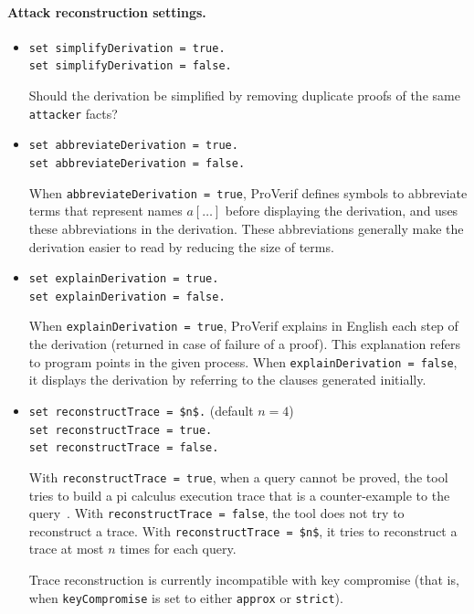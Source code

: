 \documentclass{book}
\begin{document}
\paragraph{Attack reconstruction settings.}
\begin{itemize}
\item \lstinline{set simplifyDerivation = true.}\\
\lstinline{set simplifyDerivation = false.}

Should the derivation be simplified by removing duplicate proofs
of the same \lstinline{attacker} facts?

\item \lstinline{set abbreviateDerivation = true.}\\
\lstinline{set abbreviateDerivation = false.}

When \lstinline{abbreviateDerivation = true}, ProVerif defines symbols to
abbreviate terms that represent names $a[\ldots]$ before displaying
the derivation, and uses these abbreviations in the derivation. These
abbreviations generally make the derivation easier to read by reducing
the size of terms.

\item \lstinline{set explainDerivation = true.}\\
\lstinline{set explainDerivation = false.}

When \lstinline{explainDerivation = true}, ProVerif explains in English
each step of the derivation (returned in case of failure of a proof).
This explanation refers to program points in the given process.
When \lstinline{explainDerivation = false}, it displays the derivation
by referring to the clauses generated initially.

\item \lstinline{set reconstructTrace = $n$.} (default $n = 4$)\\
\lstinline{set reconstructTrace = true.}\\
\lstinline{set reconstructTrace = false.}

With \lstinline{reconstructTrace = true}, when a query cannot be
proved, the tool tries to build a pi calculus execution trace that is
a counter-example to the query~\cite{Allamigeon05}.
With \lstinline{reconstructTrace = false}, the tool does not try
to reconstruct a trace. With \lstinline{reconstructTrace = $n$},
it tries to reconstruct a trace at most $n$ times for each query.

Trace reconstruction is currently incompatible
with key compromise (that is, when \lstinline{keyCompromise} is set to either \lstinline{approx} or \lstinline{strict}).


\end{itemize}
\end{document}
